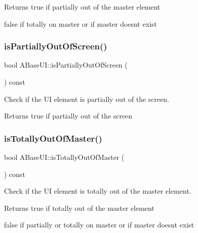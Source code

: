 \begin{DoxyReturn}{Returns}
true if partially out of the master element 

false if totally on master or if master doesn\textquotesingle{}t exist 
\end{DoxyReturn}
\mbox{\label{class_a_base_u_i_af83c894a28e16ae8c008da87a617e8fd}} 
\subsubsection{\texorpdfstring{is\+Partially\+Out\+Of\+Screen()}{isPartiallyOutOfScreen()}}
{\footnotesize\ttfamily bool A\+Base\+U\+I\+::is\+Partially\+Out\+Of\+Screen (\begin{DoxyParamCaption}{ }\end{DoxyParamCaption}) const\hspace{0.3cm}{\ttfamily [virtual]}}



Check if the UI element is partially out of the screen. 

\begin{DoxyReturn}{Returns}
true if partially out of the screen 
\end{DoxyReturn}
\mbox{\label{class_a_base_u_i_af6f2b33f73f32b6fbc02297e439b320a}} 
\subsubsection{\texorpdfstring{is\+Totally\+Out\+Of\+Master()}{isTotallyOutOfMaster()}}
{\footnotesize\ttfamily bool A\+Base\+U\+I\+::is\+Totally\+Out\+Of\+Master (\begin{DoxyParamCaption}{ }\end{DoxyParamCaption}) const\hspace{0.3cm}{\ttfamily [virtual]}}



Check if the UI element is totally out of the master element. 

\begin{DoxyReturn}{Returns}
true if totally out of the master element 

false if partially or totally on master or if master doesn\textquotesingle{}t exist 
\end{DoxyReturn}
\mbox{\label{class_a_base_u_i_a43ccdbcb5f1e7292cd013c2d1ba3704c}} 
